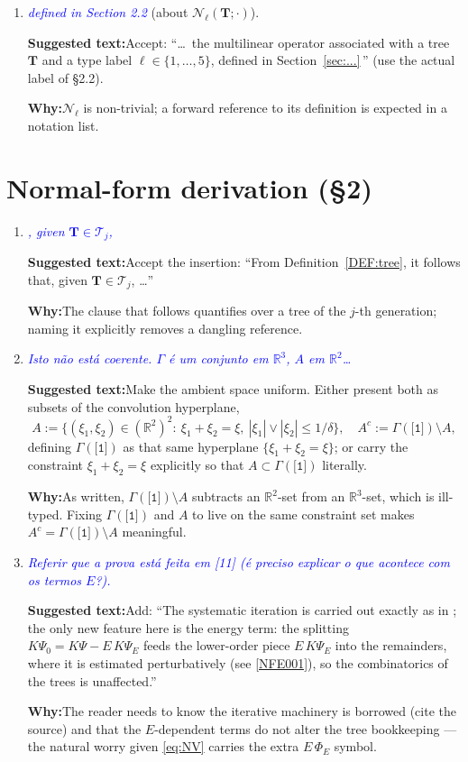 \documentclass[11pt]{article}
\newcommand{\R}{\mathbb{R}}
\newcommand{\Tr}{\mathcal{T}}
\newcommand{\TT}{\mathbf{T}}
\newcommand{\G}{\Gamma}
\newcommand{\Ncal}{\mathcal{N}}
\newcommand{\tree}[1]{\texttt{[#1]}}
\renewcommand{\l}{\ell}
\newcommand{\com}[1]{\textit{\textcolor{blue}{#1}}}
\newcommand{\sugg}[1]{\par\smallskip\textbf{Suggested text:}\quad #1}
\newcommand{\why}[1]{\par\smallskip\textbf{Why:}\quad #1\par\medskip}
\begin{document}
\begin{enumerate}[leftmargin=*]
\item[\textbf{L909 (b)}] \com{defined in Section 2.2} (about
$\Ncal_\l(\TT;\cdot)$).
\sugg{Accept: ``\dots\ the multilinear operator associated with a tree $\TT$
and a type label $\l\in\{1,\dots,5\}$, defined in
Section~\ref{sec:...}\,''} (use the actual label of \S2.2).
\why{$\Ncal_\l$ is non-trivial; a forward reference to its definition is
expected in a notation list.}

\end{enumerate}

\section*{Normal-form derivation (\S2)}

\begin{enumerate}[leftmargin=*]

\item[\textbf{L965}] \com{, given $\TT\in\Tr_j$,}
\sugg{Accept the insertion: ``From Definition~\ref{DEF:tree}, it follows
that, given $\TT\in\Tr_j$, \dots''}
\why{The clause that follows quantifies over a tree of the $j$-th generation;
naming it explicitly removes a dangling reference.}

\item[\textbf{L1214}] \com{Isto n\~ao est\'a coerente. $\Gamma$ \'e um
conjunto em $\R^3$, $A$ em $\R^2$\dots}
\sugg{Make the ambient space uniform. Either present both as subsets of the
convolution hyperplane,
\[
A:=\Big\{(\xi_1,\xi_2)\in(\R^2)^2:\ \xi_1+\xi_2=\xi,\ |\xi_1|\vee|\xi_2|\le
1/\delta\Big\},\quad A^c:=\G(\tree{1})\setminus A,
\]
defining $\G(\tree{1})$ as that same hyperplane $\{\xi_1+\xi_2=\xi\}$; or carry
the constraint $\xi_1+\xi_2=\xi$ explicitly so that $A\subset\G(\tree{1})$
literally.}
\why{As written, $\G(\tree{1})\setminus A$ subtracts an $\R^2$-set from an
$\R^3$-set, which is ill-typed. Fixing $\G(\tree{1})$ and $A$ to live on the same
constraint set makes $A^c=\G(\tree{1})\setminus A$ meaningful.}

\item[\textbf{L1525}] \com{Referir que a prova est\'a feita em [11] (\'e
preciso explicar o que acontece com os termos $E$?).}
\sugg{Add: ``The systematic iteration is carried out exactly as in
\cite{[11]}; the only new feature here is the energy term: the splitting
$K\Psi_0=K\Psi-E\,K\Psi_E$ feeds the lower-order piece $E\,K\Psi_E$ into the
remainders, where it is estimated perturbatively (see \eqref{NFE001}), so the
combinatorics of the trees is unaffected.''}
\why{The reader needs to know the iterative machinery is borrowed (cite the
source) and that the $E$-dependent terms do not alter the tree bookkeeping ---
the natural worry given \eqref{eq:NV} carries the extra $E\,\Phi_E$ symbol.}


\end{enumerate}
\end{document}
